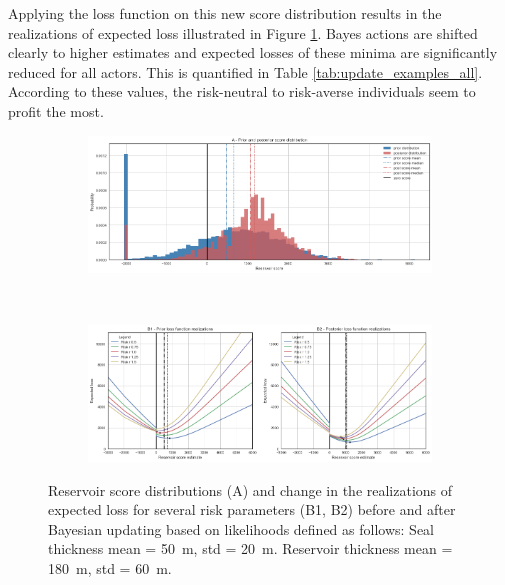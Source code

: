 	Applying the loss function on this new score distribution results in the realizations of expected loss illustrated in Figure \ref{fig:update_goodseal2_3}. Bayes actions are shifted clearly to higher estimates and expected losses of these minima are significantly reduced for all actors. This is quantified in Table \ref{tab:update_examples_all}. According to these values, the risk-neutral to risk-averse individuals seem to profit the most.
	
	\begin{figure}[h]
		\begin{subfigure}{1\textwidth}
			\centering
			\includegraphics[width=1\linewidth]{Figures/update_goodseal2.png}
		\end{subfigure}%
		\\
		\begin{subfigure}{1\textwidth}
			\centering
			\includegraphics[width=1\linewidth]{Figures/update_goodseal3.png}
		\end{subfigure}
		\caption{Reservoir score distributions (A) and change in the realizations of expected loss for several risk parameters (B1, B2) before and after Bayesian updating based on likelihoods defined as follows: Seal thickness mean = 50~m, std = 20~m. Reservoir thickness mean = 180~m, std = 60~m.}
		\label{fig:update_goodseal2_3}
	\end{figure}
	
